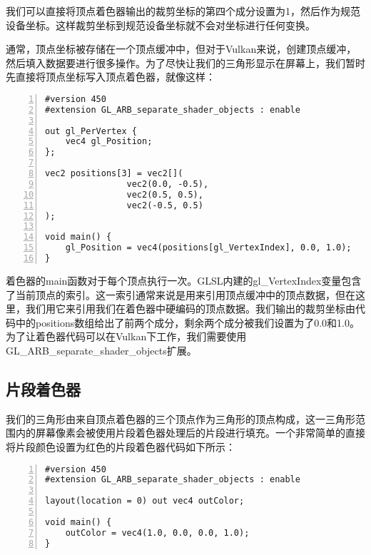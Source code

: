 \documentclass{ctexart}
\begin{document}
我们可以直接将顶点着色器输出的裁剪坐标的第四个成分设置为1，然后作为规范设备坐标。这样裁剪坐标到规范设备坐标就不会对坐标进行任何变换。

通常，顶点坐标被存储在一个顶点缓冲中，但对于Vulkan来说，创建顶点缓冲，然后填入数据要进行很多操作。为了尽快让我们的三角形显示在屏幕上，我们暂时先直接将顶点坐标写入顶点着色器，就像这样：

\begin{lstlisting}[language={[ANSI]C},keywordstyle=\color{blue!70},commentstyle=\color{red!50!green!50!blue!50},frame=shadowbox, rulesepcolor=\color{red!20!green!20!blue!20},basicstyle=\small,numbers=left, numberstyle=\tiny,breaklines=true]
#version 450
#extension GL_ARB_separate_shader_objects : enable

out gl_PerVertex {
	vec4 gl_Position;
};

vec2 positions[3] = vec2[](
				vec2(0.0, -0.5),
				vec2(0.5, 0.5),
				vec2(-0.5, 0.5)
);

void main() {
	gl_Position = vec4(positions[gl_VertexIndex], 0.0, 1.0);
}
\end{lstlisting}

着色器的main函数对于每个顶点执行一次。GLSL内建的gl\_VertexIndex变量包含了当前顶点的索引。这一索引通常来说是用来引用顶点缓冲中的顶点数据，但在这里，我们用它来引用我们在着色器中硬编码的顶点数据。我们输出的裁剪坐标由代码中的positions数组给出了前两个成分，剩余两个成分被我们设置为了0.0和1.0。为了让着色器代码可以在Vulkan下工作，我们需要使用GL\_ARB\_separate\_shader\_objects扩展。

\subsection{片段着色器}

我们的三角形由来自顶点着色器的三个顶点作为三角形的顶点构成，这一三角形范围内的屏幕像素会被使用片段着色器处理后的片段进行填充。一个非常简单的直接将片段颜色设置为红色的片段着色器代码如下所示：

\begin{lstlisting}[language={[ANSI]C},keywordstyle=\color{blue!70},commentstyle=\color{red!50!green!50!blue!50},frame=shadowbox, rulesepcolor=\color{red!20!green!20!blue!20},basicstyle=\small,numbers=left, numberstyle=\tiny,breaklines=true]
#version 450
#extension GL_ARB_separate_shader_objects : enable

layout(location = 0) out vec4 outColor;

void main() {
	outColor = vec4(1.0, 0.0, 0.0, 1.0);
}
\end{lstlisting}
\end{document}
